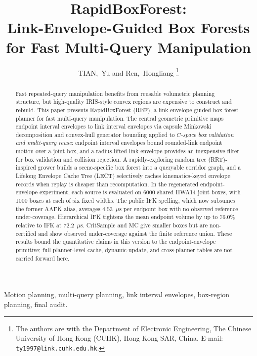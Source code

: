 \documentclass[journal]{IEEEtran}
\DeclareRobustCommand{\textsc}[1]{\textnormal{\MakeUppercase{#1}}}
\newcommand{\rbf}{\textsc{RBF}}
\begin{document}
\title{RapidBoxForest:\\ Link-Envelope-Guided Box Forests for Fast Multi-Query Manipulation}

\author{TIAN,~Yu and Ren,~Hongliang%
\thanks{The authors are with the Department of Electronic Engineering,
The Chinese University of Hong Kong (CUHK), Hong Kong SAR, China.
E-mail: \texttt{ty1997@link.cuhk.edu.hk}.}}

\maketitle

\begin{abstract}
Fast repeated-query manipulation benefits from reusable volumetric planning
structure, but high-quality IRIS-style convex regions are expensive to construct
and rebuild. This paper presents RapidBoxForest (\rbf{}), a link-envelope-guided
box-forest planner for fast multi-query manipulation. The central geometric primitive maps endpoint interval envelopes to link
interval envelopes via capsule Minkowski decomposition and convex-hull generator
bounding applied to \emph{$C$-space box validation and multi-query reuse}:
endpoint interval envelopes bound rounded-link endpoint motion over a joint box,
and a radius-lifted link envelope provides an inexpensive filter for box
validation and collision rejection. A rapidly-exploring random tree
(RRT)-inspired grower builds a scene-specific box forest into a queryable
corridor graph, and a Lifelong Envelope Cache Tree (LECT) selectively caches
kinematics-keyed envelope records when replay is cheaper than recomputation. In
the regenerated endpoint-envelope experiment, each source is evaluated on 6000
shared IIWA14 joint boxes, with 1000 boxes at each of six fixed widths. The
public IFK spelling, which now subsumes the former AAFK alias, averages
4.53~$\mu$s per endpoint box with no observed reference under-coverage.
Hierarchical IFK tightens the mean endpoint volume by up to 76.0\% relative to
IFK at 72.2~$\mu$s. CritSample and MC give smaller boxes but are
non-certified and show observed under-coverage against the finite reference
union. These results bound the quantitative claims in this version to the
endpoint-envelope primitive; full planner-level cache, dynamic-update, and
cross-planner tables are not carried forward here.
\end{abstract}

\begin{IEEEkeywords}
Motion planning, multi-query planning, link interval envelopes, box-region planning, final audit.
\end{IEEEkeywords}
\end{document}
